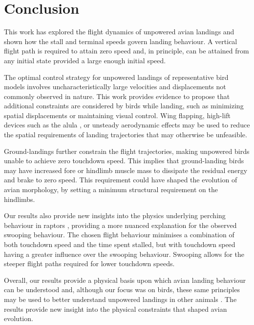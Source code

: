 \section{Conclusion} \label{sec-conclusion}

This work has explored the flight dynamics of unpowered avian landings and shown how the stall and terminal speeds govern landing behaviour. A vertical flight path is required to attain zero speed and, in principle, can be attained from any initial state provided a large enough initial speed.

The optimal control strategy for unpowered landings of representative bird models involves uncharacteristically large velocities and displacements not commonly observed in nature. This work provides evidence to propose that additional constraints are considered by birds while landing, such as minimizing spatial displacements or maintaining visual control. Wing flapping, high-lift devices such as the alula \cite{leeFunctionAlulaAvian2015}, or unsteady aerodynamic effects \cite{poletUnsteadyDynamicsRapid2015} may be used to reduce the spatial requirements of landing trajectories that may otherwise be unfeasible.

Ground-landings further constrain the flight trajectories, making unpowered birds unable to achieve zero touchdown speed. This implies that ground-landing birds may have increased fore or hindlimb muscle mass to dissipate the residual energy and brake to zero speed. This requirement could have shaped the evolution of avian morphology, by setting a minimum structural requirement on the hindlimbs.

Our results also provide new insights into the physics underlying perching behaviour in raptors \cite{kleinheerenbrinkOptimizationAvianPerching2022}, providing a more nuanced explanation for the observed swooping behaviour. The chosen flight behaviour minimises a combination of both touchdown speed and the time spent stalled, but with touchdown speed having a greater influence over the swooping behaviour. Swooping allows for the steeper flight paths required for lower touchdown speeds.

Overall, our results provide a physical basis upon which avian landing behaviour can be understood and, although our focus was on birds, these same principles may be used to better understand unpowered landings in other animals \cite{byrnesEcologicalBiomechanicalInsights2011}. The results provide new insight into the physical constraints that shaped avian evolution.
